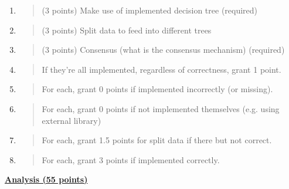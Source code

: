 \documentclass[
]{article}
\begin{document}
\begin{enumerate}
  \begin{enumerate}
  \def\labelenumii{\alph{enumii}.}
  \item
    \begin{quote}
    (3 points) Make use of implemented decision tree (required)
    \end{quote}
  \item
    \begin{quote}
    (3 points) Split data to feed into different trees
    \end{quote}
  \item
    \begin{quote}
    (3 points) Consensus (what is the consensus mechanism) (required)
    \end{quote}
  \item
    \begin{quote}
    If they're all implemented, regardless of correctness, grant 1
    point.
    \end{quote}
  \item
    \begin{quote}
    For each, grant 0 points if implemented incorrectly (or missing).
    \end{quote}
  \item
    \begin{quote}
    For each, grant 0 points if not implemented themselves (e.g. using
    external library)
    \end{quote}
  \item
    \begin{quote}
    For each, grant 1.5 points for split data if there but not correct.
    \end{quote}
  \item
    \begin{quote}
    For each, grant 3 points if implemented correctly.
    \end{quote}
  \end{enumerate}
\end{enumerate}

\textbf{\uline{Analysis (55 points)}}
\end{document}
